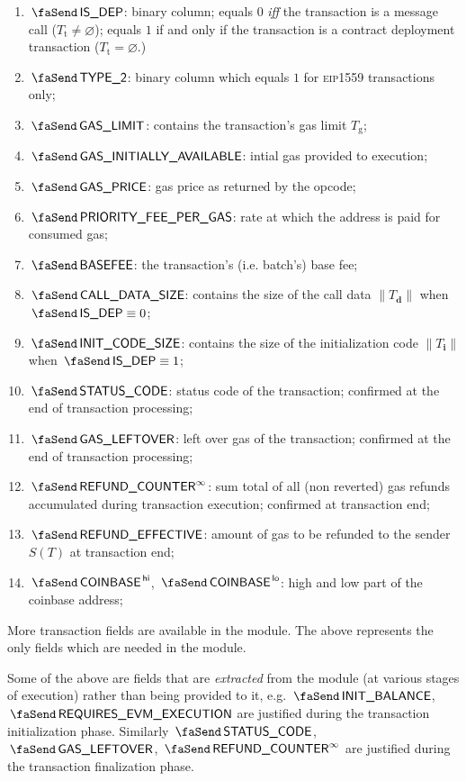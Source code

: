 \begin{enumerate}
	\item $\txIsDeployment$:
		\godGiven{}
		binary column; equals $0$ \emph{iff} the transaction is a message call ($T_\text{t} \neq \varnothing$); equals $1$ if and only if the transaction is a contract deployment transaction ($T_{\text{t}} = \varnothing$.)
	\item $\txIsTypeTwo$:
		\godGiven{}
		binary column which equals $1$ for \textsc{eip1559} transactions only;
	\item $\txGasLimit$:
		\godGiven{}
		contains the transaction's gas limit $T_\text{g}$;
	\item $\txInitialGas$:
		\godGiven{}
		intial gas provided to execution; 
	\item $\txGasPrice$:
		\godGiven{}
		gas price as returned by the  opcode;
	\item $\txPriorityFeePerGas$:
		\godGiven{}
		rate at which the  address is paid for consumed gas;
	\item $\txBasefee$:
		\godGiven{}
		the transaction's (i.e. batch's) base fee;
	\item $\txCallDataSize$:
		\godGiven{}
		contains the size of the call data $\|T_\textbf{d}\|$ when $\txIsDeployment \equiv 0$;
	\item $\txInitCodeSize$:
		\godGiven{}
		contains the size of the initialization code $\|T_\textbf{i}\|$ when $\txIsDeployment \equiv 1$;
	\item $\txStatusCode$:
		\markAsJustifiedHere{}
		\godGiven{}
		status code of the transaction; confirmed at the end of transaction processing; 
	\item $\txLeftoverGas$:
		\markAsJustifiedHere{}
		\godGiven{}
		left over gas of the transaction; confirmed at the end of transaction processing;
	\item $\txFinalRefundCounter$:
		\markAsJustifiedHere{}
		\godGiven{}
		sum total of all (non reverted) gas refunds accumulated during transaction execution; confirmed at transaction end; 
	\item $\txEffectiveRefund$:
		\godGiven{}
		amount of gas to be refunded to the sender $S(T)$ at transaction end;
	\item $\txCoinbase\high$, $\txCoinbase\low$:
		\godGiven{}
		high and low part of the coinbase address;
\end{enumerate}
\saNote{}
More transaction fields are available in the \txnDataMod{} module. The above represents the only fields which are needed in the \hubMod{} module.

\saNote{}
Some of the above are fields that are \emph{extracted} from the \hubMod{} module (at various stages of execution) rather than being provided to it, e.g. 
$\txInitialBalance$,
$\txRequiresEvmExecution$
are justified during the transaction initialization phase.
Similarly
$\txStatusCode$,
$\txLeftoverGas$,
$\txFinalRefundCounter$
are justified during the transaction finalization phase.

